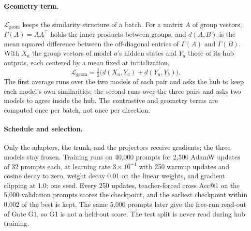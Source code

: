 \paragraph{Geometry term.} $\mathcal{L}_{\text{geom}}$ keeps the similarity structure of a batch. For a matrix $A$ of group vectors, $\Gamma(A) = AA^{\top}$ holds the inner products between groups, and $d(A,B)$ is the mean squared difference between the off-diagonal entries of $\Gamma(A)$ and $\Gamma(B)$. With $X_a$ the group vectors of model $a$'s hidden states and $Y_a$ those of its hub outputs, each centered by a mean fixed at initialization,
\begin{equation}
\mathcal{L}_{\text{geom}} = \tfrac{1}{2}\Big(\overline{d(X_a, Y_a)} + \overline{d(Y_a, Y_b)}\Big).
\label{eq:hub:geom}
\end{equation}
The first average runs over the two models of each pair and asks the hub to keep each model's own similarities; the second runs over the three pairs and asks two models to agree inside the hub. The contrastive and geometry terms are computed once per batch, not once per direction.

\paragraph{Schedule and selection.} Only the adapters, the trunk, and the projectors receive gradients; the three models stay frozen. Training runs on 40,000 prompts for 2,500 AdamW updates of 32 prompts each, at learning rate $3\times10^{-4}$ with 250 warmup updates and cosine decay to zero, weight decay 0.01 on the linear weights, and gradient clipping at 1.0; one seed. Every 250 updates, teacher-forced cross Acc@1 on the 5,000 validation prompts scores the checkpoint, and the earliest checkpoint within 0.002 of the best is kept. The same 5,000 prompts later give the free-run read-out of Gate G1, so G1 is not a held-out score. The test split is never read during hub training.
